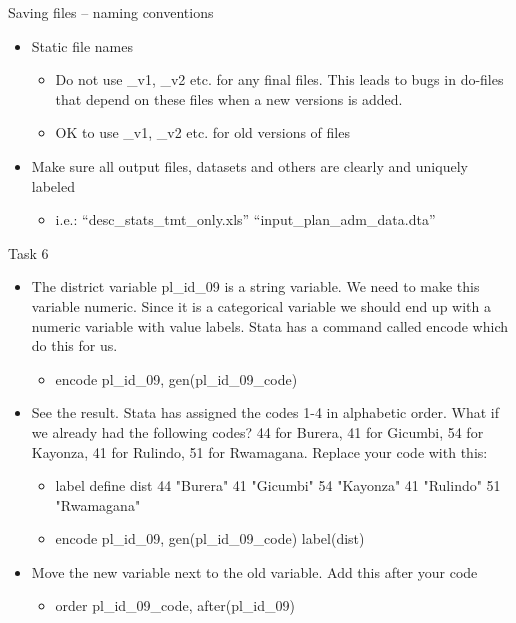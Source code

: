 \documentclass[aspectratio=169]{beamer}
\begin{document}
\begin{frame}{Saving files – naming conventions}
\begin{itemize}
	\item Static file names
		\begin{itemize}
			\item 	Do not use \_v1, \_v2 etc. for any final files. This leads to bugs in do-files that depend on these files when a new versions is added.
			\item OK to use \_v1, \_v2 etc. for old versions of files
		\end{itemize}
	\item Make sure all output files, datasets and others are clearly and uniquely labeled
		\begin{itemize}
			\item  i.e.: “desc\_stats\_tmt\_only.xls” \newline	“input\_plan\_adm\_data.dta”
		\end{itemize}
\end{itemize}
\end{frame}

\begin{frame}{Task 6}
\begin{itemize}
	\item The district variable  pl\_id\_09 is a string variable. We need to make this variable numeric. Since it is a categorical variable we should end up with a numeric variable with value labels. Stata has a command called encode which do this for us. 
		\begin{itemize}
			\item encode  pl\_id\_09,  gen(pl\_id\_09\_code)
		\end{itemize}
	\item See the result. Stata has assigned the codes 1-4 in alphabetic order. What if we already had the following codes? 44 for Burera, 41  for Gicumbi, 54 for Kayonza,  41 for Rulindo, 51 for Rwamagana. Replace your code with this:
		\begin{itemize}
			\item 	label define dist 44 "Burera" 41 "Gicumbi" 54 "Kayonza" 41 "Rulindo" 51 "Rwamagana"
			\item   encode  pl\_id\_09,  gen(pl\_id\_09\_code) label(dist)
		\end{itemize}
	\item Move the new variable next to the old variable. Add this after your code
		\begin{itemize}
			\item order pl\_id\_09\_code, after(pl\_id\_09)
		\end{itemize}
	\end{itemize}
\end{frame}
	
\end{document}
